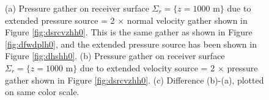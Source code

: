 \documentclass[12pt]{geophysics}
\begin{document}
\begin{figure}
  \centering
  \caption{(a) Pressure gather on receiver surface
    $\Sigma_r=\{z=1000\mbox{ m}\}$ due to extended pressure source = 2
    $\times$ normal velocity gather shown in Figure
    \ref{fig:dsrcvzhh0}. This is the same gather as shown in Figure
    \ref{fig:dfwdplh0}, and the extended pressure source has been
    shown in Figure \ref{fig:dhshh0}.
    (b) Pressure gather on receiver surface
    $\Sigma_r=\{z=1000\mbox{ m}\}$ due to extended velocity source = 2
    $\times$ pressure gather shown in Figure
    \ref{fig:dsrcvzhh0}. (c) Difference (b)-(a), plotted on same color
    scale.}
\end{figure}
\end{document}
